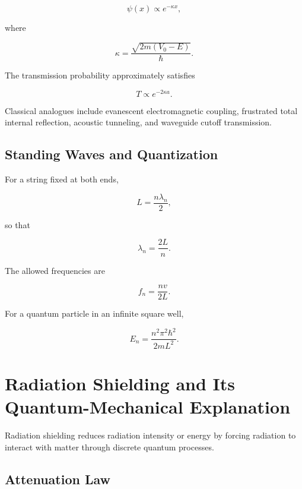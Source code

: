 \documentclass[12pt]{article}
\begin{document}
\begin{equation}
\psi(x)\propto e^{-\kappa x},
\end{equation}

where

\begin{equation}
\kappa
=
\frac{\sqrt{2m(V_0-E)}}{\hbar}.
\end{equation}

The transmission probability approximately satisfies

\begin{equation}
\boxed{T\propto e^{-2\kappa a}}.
\end{equation}

Classical analogues include evanescent electromagnetic coupling, frustrated total internal reflection, acoustic tunneling, and waveguide cutoff transmission.

\subsection{Standing Waves and Quantization}

For a string fixed at both ends,

\begin{equation}
L=\frac{n\lambda_n}{2},
\end{equation}

so that

\begin{equation}
\lambda_n=\frac{2L}{n}.
\end{equation}

The allowed frequencies are

\begin{equation}
f_n=\frac{nv}{2L}.
\end{equation}

For a quantum particle in an infinite square well,

\begin{equation}
E_n=\frac{n^2\pi^2\hbar^2}{2mL^2}.
\end{equation}

\section{Radiation Shielding and Its Quantum-Mechanical Explanation}

Radiation shielding reduces radiation intensity or energy by forcing radiation to interact with matter through discrete quantum processes.

\subsection{Attenuation Law}
\end{document}
